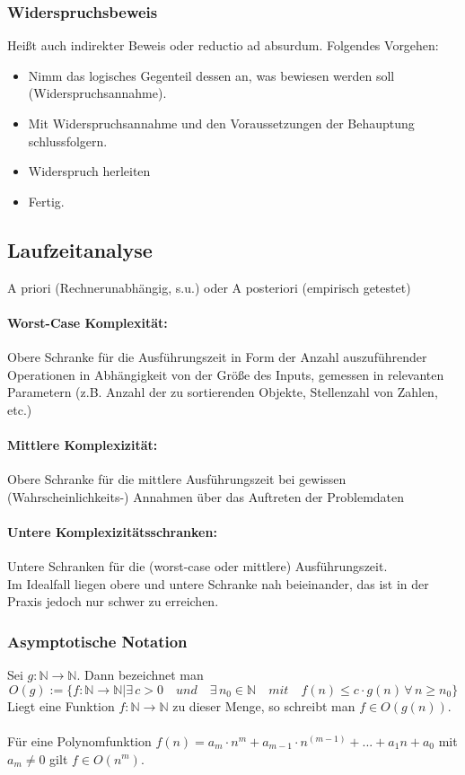 \documentclass[fleqn]{scrartcl}
\begin{document}
\subsubsection{Widerspruchsbeweis}
Heißt auch indirekter Beweis oder reductio ad absurdum. Folgendes Vorgehen:
\begin{itemize}
\item Nimm das logisches Gegenteil dessen an, was bewiesen werden soll (Widerspruchsannahme).
\item Mit Widerspruchsannahme und den Voraussetzungen der Behauptung schlussfolgern.
\item Widerspruch herleiten
\item Fertig.
\end{itemize}


\newpage
\subsection{Laufzeitanalyse}
A priori (Rechnerunabhängig, s.u.) oder A posteriori (empirisch getestet)


\paragraph*{Worst-Case Komplexität:} Obere Schranke für die Ausführungszeit in Form der Anzahl auszuführender Operationen in Abhängigkeit von der Größe des Inputs, gemessen in relevanten Parametern (z.B. Anzahl der zu sortierenden Objekte, Stellenzahl von Zahlen, etc.)
\paragraph*{Mittlere Komplexizität:} Obere Schranke für die mittlere Ausführungszeit bei gewissen (Wahrscheinlichkeits-) Annahmen über das Auftreten der Problemdaten
\paragraph*{Untere Komplexizitätsschranken:} Untere Schranken für die (worst-case oder mittlere) Ausführungszeit.\\

Im Idealfall liegen obere und untere Schranke nah beieinander, das ist in der Praxis jedoch nur schwer zu erreichen.

\subsubsection{Asymptotische Notation}
Sei $g: \mathbb{N} \rightarrow \mathbb{N}$. Dann bezeichnet man
\[O(g) := \{ f: \mathbb{N} \rightarrow \mathbb{N} | \exists \, c > 0 \quad und \quad \exists \, n_0 \in \mathbb{N} \quad mit \quad f(n) \leq c \cdot g(n) \,  \forall \, n \geq n_0 \}\]
Liegt eine Funktion $ f: \mathbb{N} \rightarrow \mathbb{N} $ zu dieser Menge, so schreibt man $f \in O(g(n))$.\\
\\
Für eine Polynomfunktion $f(n) = a_m \cdot n^{m} + a_{m-1} \cdot n^{(m-1)} + ... + a_1 n + a_0 $ mit $a_m \neq 0$ gilt $f \in O(n^{m}).$\\
\end{document}

